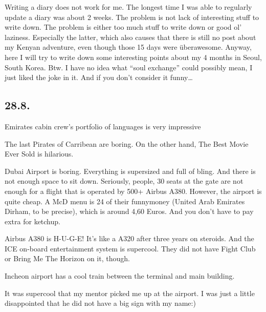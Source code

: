 \begin{post}
	\begin{content}
Writing a diary does not work for me. The longest time I was able to regularly update a diary was about 2 weeks. The problem is not lack of interesting stuff to write down. The problem is either too much stuff to write down or good ol' laziness. Especially the latter, which also causes that there is still no post about my Kenyan adventure, even though those 15 days were überawesome. Anyway, here I will try to write down some interesting points about my 4 months in Seoul, South Korea. Btw. I have no idea what ``soul exchange'' could possibly mean, I just liked the joke in it. And if you don't consider it funny\ldots

\subsection{28.8.}

\begin{itemize*}

	\item Emirates cabin crew's portfolio of languages is very impressive

	\item The last Pirates of Carribean are boring. On the other hand, The Best Movie Ever Sold is hilarious.

	\item Dubai Airport is boring. Everything is supersized and full of bling. And there is not enough space to sit down. Seriously, people, 30 seats at the gate are not enough for a flight that is operated by 500+ Airbus A380. However, the airport is quite cheap. A McD menu is 24 of their funnymoney (United Arab Emirates Dirham, to be precise), which is around 4,60 Euros. And you don't have to pay extra for ketchup.

	\item Airbus A380 is H-U-G-E! It's like a A320 after three years on steroids. And the ICE on-board entertainment system is supercool. They did not have Fight Club or Bring Me The Horizon on it, though.

	\item Incheon airport has a cool train between the terminal and main building.

	\item It was supercool that my mentor picked me up at the airport. I was just a little disappointed that he did not have a big sign with my name:)


\end{itemize*}
\end{content}
\end{post}
